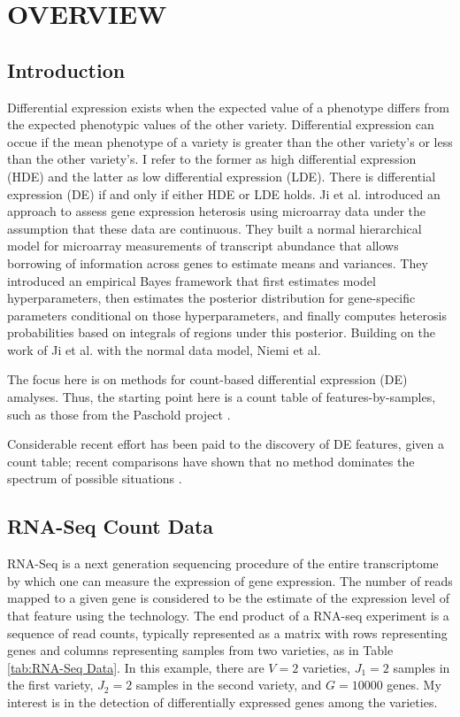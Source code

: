 \chapter{OVERVIEW}



\section{Introduction}

Differential expression exists when the expected value of a phenotype differs from the expected phenotypic values of the other variety. Differential expression can occue if the mean phenotype of a variety is greater than the other variety's or less than the other variety's. I refer to the former as high differential expression (HDE) and the latter as low differential expression (LDE). There is differential expression (DE) if and only if either HDE or LDE holds. Ji et al. \cite{ji2014estimation} introduced an approach to assess gene expression heterosis using microarray data under the assumption that these data are continuous. They built a normal hierarchical model for microarray measurements of transcript abundance that allows borrowing of information across genes to estimate means and variances. They introduced an empirical Bayes framework that first estimates model hyperparameters, then estimates the posterior distribution for gene-specific parameters conditional on those hyperparameters, and finally computes heterosis probabilities based on integrals of regions under this posterior. Building on the work of Ji et al. with the normal data model, Niemi et al. \cite{niemi2015empirical}

The focus here is on methods for count-based differential expression (DE) amalyses. Thus, the starting point here is a count table of features-by-samples, such as those from the Paschold project \cite{paschold2012complementation}.

Considerable recent effort has been paid to the discovery of DE features, given a count table; recent comparisons have shown that no method dominates the spectrum of possible situations \cite{soneson2013comparison}\cite{rapaport2013comprehensive}. 

\section{RNA-Seq Count Data}

RNA-Seq is a next generation sequencing procedure of the entire transcriptome by which one can measure the expression of gene expression. The number of reads mapped to a given gene is considered to be the estimate of the expression level of that feature using the technology. The end product of a RNA-seq experiment is a sequence of read counts, typically represented as a matrix with rows representing genes and columns representing samples from two varieties, as in Table \ref{tab:RNA-Seq Data}. In this example, there are $V=2$ varieties, $J_1 = 2$ samples in the first variety, $J_2=2$ samples in the second variety, and $G=10000$ genes. My interest is in the detection of differentially expressed genes among the varieties. 

